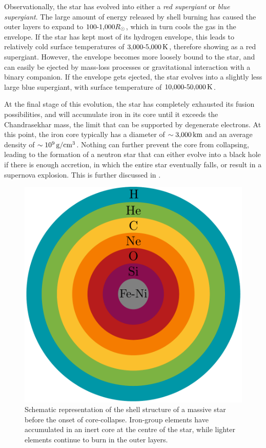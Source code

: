 Observationally, the star has evolved into either a \emph{red supergiant} or \emph{blue supergiant}. The large amount of energy released by shell burning has caused the outer layers to expand to \(100\text{-}1{,}000R_{\odot}\), which in turn cools the gas in the envelope. If the star has kept most of its hydrogen envelope, this leads to relatively cold surface temperatures of \(3{,}000\text{-}5{,}000\,\mathrm{K}\), therefore showing as a red supergiant. However, the envelope becomes more loosely bound to the star, and can easily be ejected by mass-loss processes or gravitational interaction with a binary companion. If the envelope gets ejected, the star evolves into a slightly less large blue supergiant, with surface temperature of \(10{,}000\text{-}50{,}000\,\mathrm{K}\).

At the final stage of this evolution, the star has completely exhausted its fusion possibilities, and will accumulate iron in its core until it exceeds the Chandrasekhar mass, the limit that can be supported by degenerate electrons. At this point, the iron core typically has a diameter of \(\sim3{,}000\,\mathrm{km}\) and an average density of \(\sim10^9\,\mathrm{g/cm^3}\). Nothing can further prevent the core from collapsing, leading to the formation of a neutron star that can either evolve into a black hole if there is enough accretion, in which the entire star eventually falls, or result in a supernova explosion. This is further discussed in .

\begin{figure}[ht!]
    \centering
    \includegraphics[width=0.5\linewidth]{figures/shell.pdf}
    \caption{Schematic representation of the shell structure of a massive star before the onset of core-collapse. Iron-group elements have accumulated in an inert core at the centre of the star, while lighter elements continue to burn in the outer layers.}
    \label{fig:shell_burning}
\end{figure}

